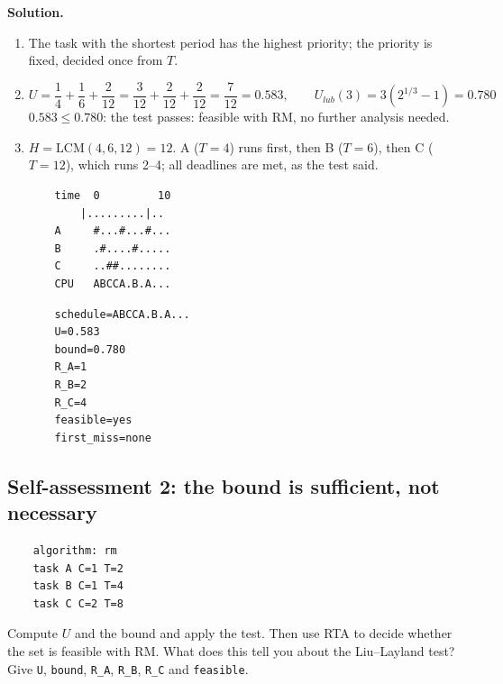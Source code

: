 \textbf{Solution.}
\begin{enumerate}
    \item The task with the shortest period has the highest priority; the priority is fixed, decided once from $T$.
    \item
    \[
    U = \frac{1}{4} + \frac{1}{6} + \frac{2}{12} = \frac{3}{12} + \frac{2}{12} + \frac{2}{12} = \frac{7}{12} = 0.583, \qquad U_{lub}(3) = 3 \left( 2^{1/3} - 1 \right) = 0.780
    \]
    $0.583 \le 0.780$: the test passes: feasible with RM, no further analysis needed.
    \item $H = \mathrm{LCM}(4, 6, 12) = 12$. A ($T = 4$) runs first, then B ($T = 6$), then C ($T = 12$), which runs 2--4; all deadlines are met, as the test said.
\begin{verbatim}
    time  0         10
        |.........|..
    A     #...#...#...
    B     .#....#.....
    C     ..##........
    CPU   ABCCA.B.A...
\end{verbatim}
\begin{verbatim}
    schedule=ABCCA.B.A...
    U=0.583
    bound=0.780
    R_A=1
    R_B=2
    R_C=4
    feasible=yes
    first_miss=none
\end{verbatim}
\end{enumerate}

\subsection*{Self-assessment 2: the bound is sufficient, not necessary}
\begin{lstlisting}
    algorithm: rm
    task A C=1 T=2
    task B C=1 T=4
    task C C=2 T=8
\end{lstlisting}
Compute $U$ and the bound and apply the test. Then use RTA to decide whether the set is feasible with RM. What does this tell you about the Liu--Layland test? Give \texttt{U}, \texttt{bound}, \texttt{R\_A}, \texttt{R\_B}, \texttt{R\_C} and \texttt{feasible}.

